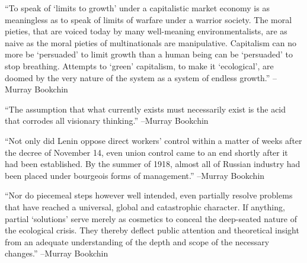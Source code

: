 \documentclass{article}%
\begin{document}
\linebreak%
\vspace{1mm}%
\begin{minipage}{\textwidth}%
\flushleft%
“To speak of ‘limits to growth’ under a capitalistic market economy is as meaningless as to speak of limits of warfare under a warrior society. The moral pieties, that are voiced today by many well{-}meaning environmentalists, are as naive as the moral pieties of multinationals are manipulative. Capitalism can no more be ‘persuaded’ to limit growth than a human being can be ‘persuaded’ to stop breathing. Attempts to ‘green’ capitalism, to make it ‘ecological’, are doomed by the very nature of the system as a system of endless growth.”%
\linebreak%
\vspace{1mm}%
–Murray Bookchin%
\linebreak%
\vspace{1mm}%
\end{minipage}%
\linebreak%
\vspace{1mm}%
\begin{minipage}{\textwidth}%
\flushleft%
“The assumption that what currently exists must necessarily exist is the acid that corrodes all visionary thinking.”%
\linebreak%
\vspace{1mm}%
–Murray Bookchin%
\linebreak%
\vspace{1mm}%
\end{minipage}%
\linebreak%
\vspace{1mm}%
\begin{minipage}{\textwidth}%
\flushleft%
“Not only did Lenin oppose direct workers' control within a matter of weeks after the decree of November 14, even union control came to an end shortly after it had been established. By the summer of 1918, almost all of Russian industry had been placed under bourgeois forms of management.”%
\linebreak%
\vspace{1mm}%
–Murray Bookchin%
\linebreak%
\vspace{1mm}%
\end{minipage}%
\linebreak%
\vspace{1mm}%
\begin{minipage}{\textwidth}%
\flushleft%
“Nor do piecemeal steps however well intended, even partially resolve problems that have reached a universal, global and catastrophic character. If anything, partial ‘solutions’ serve merely as cosmetics to conceal the deep{-}seated nature of the ecological crisis. They thereby deflect public attention and theoretical insight from an adequate understanding of the depth and scope of the necessary changes.”%
\linebreak%
\vspace{1mm}%
–Murray Bookchin%
\linebreak%
\vspace{1mm}%
\end{minipage}%
\end{document}
